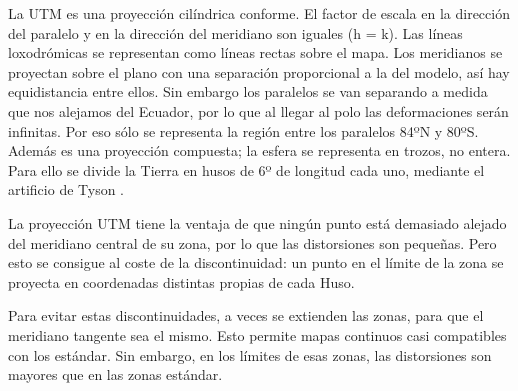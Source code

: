 La UTM es una proyección cilíndrica conforme. El factor de escala en la dirección del paralelo y en la dirección del meridiano son iguales (h = k). Las líneas loxodrómicas se representan como líneas rectas sobre el mapa. Los meridianos se proyectan sobre el plano con una separación proporcional a la del modelo, así hay equidistancia entre ellos. Sin embargo los paralelos se van separando a medida que nos alejamos del Ecuador, por lo que al llegar al polo las deformaciones serán infinitas. Por eso sólo se representa la región entre los paralelos 84ºN y 80ºS. Además es una proyección compuesta; la esfera se representa en trozos, no entera. Para ello se divide la Tierra en husos de 6º de longitud cada uno, mediante el artificio de Tyson .

La proyección UTM tiene la ventaja de que ningún punto está demasiado alejado del meridiano central de su zona, por lo que las distorsiones son pequeñas. Pero esto se consigue al coste de la discontinuidad: un punto en el límite de la zona se proyecta en coordenadas distintas propias de cada Huso.

Para evitar estas discontinuidades, a veces se extienden las zonas, para que el meridiano tangente sea el mismo. Esto permite mapas continuos casi compatibles con los estándar. Sin embargo, en los límites de esas zonas, las distorsiones son mayores que en las zonas estándar.

